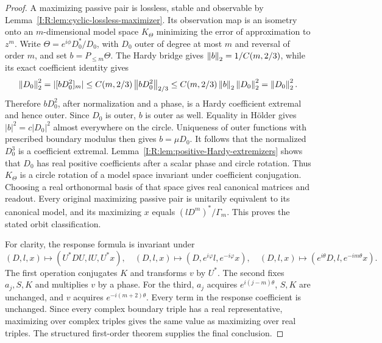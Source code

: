 \begin{proof}
A maximizing passive pair is lossless, stable and observable by
Lemma~\ref{I:R:lem:cyclic-lossless-maximizer}.  Its observation map is an
isometry onto an $m$-dimensional model space $K_\Theta$ minimizing the
error of approximation to $z^m$.  Write
$\Theta=e^{i\phi}D_0^*/D_0$, with $D_0$ outer of degree at most $m$
and reversal of order $m$, and set $b=P_{\le m}\Theta$.
The Hardy bridge gives $\left\lVert b\right\rVert_2=1/C(m,2/3)$, while its exact
coefficient identity gives
\[
 \left\lVert D_0\right\rVert_2^2=|[bD_0^2]_m|
 \le C(m,2/3)\left\lVert bD_0^2\right\rVert_{2/3}
 \le C(m,2/3)\left\lVert b\right\rVert_2\left\lVert D_0\right\rVert_2^2
 =\left\lVert D_0\right\rVert_2^2.
\]
Therefore $bD_0^2$, after normalization and a phase, is a Hardy
coefficient extremal and hence outer.  Since $D_0$ is outer, $b$ is
outer as well.  Equality in H\"older gives
$|b|^2=c|D_0|^2$ almost everywhere on the circle.  Uniqueness of outer
functions with prescribed boundary modulus then gives $b=\mu D_0$.
It follows that the normalized $D_0^3$ is a coefficient extremal.
Lemma~\ref{I:R:lem:positive-Hardy-extremizers} shows that $D_0$ has real
positive coefficients after a scalar phase and circle rotation.
Thus $K_\Theta$ is a circle rotation of a model space invariant under
coefficient conjugation.  Choosing a real orthonormal basis of that
space gives real canonical matrices and readout.  Every original
maximizing passive pair is unitarily equivalent to its canonical
model, and its maximizing $x$ equals $(lD^m)^*/\Gamma_m$.
This proves the stated orbit classification.

For clarity, the response formula is invariant under
\[
 (D,l,x)\mapsto(U^*DU,lU,U^*x),\quad
 (D,l,x)\mapsto(D,e^{i\varphi}l,e^{-i\varphi}x),\quad
 (D,l,x)\mapsto(e^{i\theta}D,l,e^{-im\theta}x).
\]
The first operation conjugates $K$ and transforms $v$ by $U^*$.
The second fixes $a_j,S,K$ and multiplies $v$ by a phase.
For the third, $a_j$ acquires $e^{i(j-m)\theta}$,
$S,K$ are unchanged, and $v$ acquires $e^{-i(m+2)\theta}$.
Every term in the response coefficient is unchanged.  Since every
complex boundary triple has a real representative, maximizing over
complex triples gives the same value as maximizing over real triples.
The structured first-order theorem supplies the final conclusion.
\end{proof}
